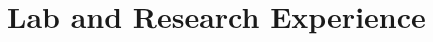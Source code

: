 \documentclass[letterpaper]{resume}
\begin{document}
\section{Lab and Research Experience}

%


\end{document}
